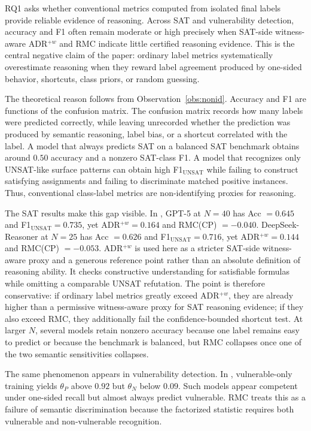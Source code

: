 \documentclass[conference]{IEEEtran}
\theoremstyle{remark}
\begin{document}
RQ1 asks whether conventional metrics computed from isolated final labels provide reliable evidence of reasoning.  Across SAT and vulnerability detection, accuracy and F1 often remain moderate or high precisely when SAT-side witness-aware ADR$^{+w}$ and RMC indicate little certified reasoning evidence.  This is the central negative claim of the paper: ordinary label metrics systematically overestimate reasoning when they reward label agreement produced by one-sided behavior, shortcuts, class priors, or random guessing.

The theoretical reason follows from Observation~\ref{obs:nonid}.  Accuracy and F1 are functions of the confusion matrix.  The confusion matrix records how many labels were predicted correctly, while leaving unrecorded whether the prediction was produced by semantic reasoning, label bias, or a shortcut correlated with the label.  A model that always predicts SAT on a balanced SAT benchmark obtains around $0.50$ accuracy and a nonzero SAT-class F1.  A model that recognizes only UNSAT-like surface patterns can obtain high F1$_{\mathrm{UNSAT}}$ while failing to construct satisfying assignments and failing to discriminate matched positive instances.  Thus, conventional class-label metrics are non-identifying proxies for reasoning.

The SAT results make this gap visible.  In , GPT-5 at $N=40$ has Acc $=0.645$ and F1$_{\mathrm{UNSAT}}=0.735$, yet ADR$^{+w}=0.164$ and RMC(CP) $=-0.040$.  DeepSeek-Reasoner at $N=25$ has Acc $=0.626$ and F1$_{\mathrm{UNSAT}}=0.716$, yet ADR$^{+w}=0.144$ and RMC(CP) $=-0.053$.  ADR$^{+w}$ is used here as a stricter SAT-side witness-aware proxy and a generous reference point rather than an absolute definition of reasoning ability.  It checks constructive understanding for satisfiable formulas while omitting a comparable UNSAT refutation.  The point is therefore conservative: if ordinary label metrics greatly exceed ADR$^{+w}$, they are already higher than a permissive witness-aware proxy for SAT reasoning evidence; if they also exceed RMC, they additionally fail the confidence-bounded shortcut test.  At larger $N$, several models retain nonzero accuracy because one label remains easy to predict or because the benchmark is balanced, but RMC collapses once one of the two semantic sensitivities collapses.

The same phenomenon appears in vulnerability detection.  In , vulnerable-only training yields $\theta_P$ above $0.92$ but $\theta_N$ below $0.09$.  Such models appear competent under one-sided recall but almost always predict vulnerable.  RMC treats this as a failure of semantic discrimination because the factorized statistic requires both vulnerable and non-vulnerable recognition.
\end{document}
